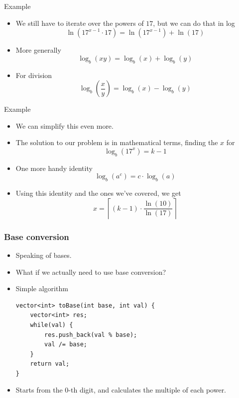 \documentclass{beamer}
\newcommand\p[1]{\left(#1\right)}
\begin{document}
\begin{frame}[plain]{Example}
  \vspace{20pt}
  \begin{itemize}
    \item We still have to iterate over the powers of $17$, but we can do that in log
      \[
        \ln(17^{x-1} \cdot 17) = \ln(17^{x-1}) + \ln(17)
      \]
    \item More generally
      \[
        \log_b(xy) = \log_b(x) + \log_b(y)
      \]
    \item For division
      \[
        \log_b\p{\frac{x}{y}} = \log_b(x) - \log_b(y)
      \]
  \end{itemize}
\end{frame}

\begin{frame}[plain]{Example}
  \vspace{20pt}
  \begin{itemize}
    \item We can simplify this even more.
    \item The solution to our problem is in mathematical terms, finding the $x$ for
      \[
        \log_b(17^x) = k - 1
      \]
    \item One more handy identity
      \[
        \log_b(a^c) = c \cdot \log_b(a)
      \]
    \item Using this identity and the ones we've covered, we get
      \[
        x = \left\lceil (k-1) \cdot \frac{\ln(10)}{\ln(17)} \right\rceil
      \]
  \end{itemize}
\end{frame}

\begin{frame}
  \frametitle{Base conversion}
  \begin{itemize}
    \item Speaking of bases.
    \item What if we actually need to use base conversion?
    \item Simple algorithm
      \begin{verbatim}
vector<int> toBase(int base, int val) {
    vector<int> res;
    while(val) {
        res.push_back(val % base);
        val /= base;
    }
    return val;
}
      \end{verbatim}
    \item Starts from the $0$-th digit, and calculates the multiple of each power.
  \end{itemize}
\end{frame}
\end{document}

